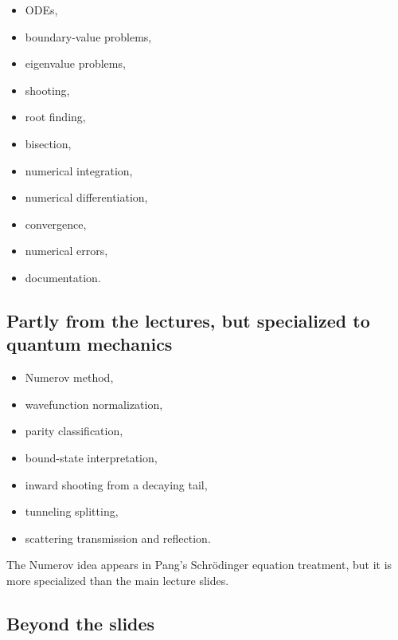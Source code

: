 \documentclass[11pt]{article}
\begin{document}
    \begin{itemize}
        \item ODEs,
        \item boundary-value problems,
        \item eigenvalue problems,
        \item shooting,
        \item root finding,
        \item bisection,
        \item numerical integration,
        \item numerical differentiation,
        \item convergence,
        \item numerical errors,
        \item documentation.
    \end{itemize}

    \subsection{Partly from the lectures, but specialized to quantum mechanics}

    \begin{itemize}
        \item Numerov method,
        \item wavefunction normalization,
        \item parity classification,
        \item bound-state interpretation,
        \item inward shooting from a decaying tail,
        \item tunneling splitting,
        \item scattering transmission and reflection.
    \end{itemize}

    The Numerov idea appears in Pang's Schr\"odinger equation treatment, but it is more specialized than the main lecture slides.

    \subsection{Beyond the slides}
\end{document}

